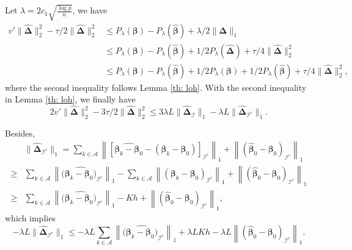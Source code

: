 \documentclass[twoside,12pt]{article}
\newcommand{\mb}[1]{\boldsymbol{\mathbf{#1}}}
\newcommand{\wh}[1]{\widehat{#1}}
\begin{document}
Let $\lambda= 2c_1 \sqrt{\frac{\log p}{n}}$, we have
\begin{equation*}
	\begin{aligned}
		v'\|\wh{\mb\Delta}\|_2^2-\tau/2\| \wh{\mb\Delta}\|_2^2&\leq P_{\lambda}(\mb\beta)-P_{\lambda}(\wh{\mb\beta})+\lambda/2\| \wh{\mb\Delta}\|_1\\
		&\leq P_{\lambda}(\mb\beta)-P_{\lambda}(\wh{\mb\beta})+1/2P_{\lambda}(\wh{\mb\Delta})+\tau/4 \|\wh{\mb\Delta}\|_2^2\\
  &\leq P_{\lambda}(\mb\beta)-P_{\lambda}(\wh{\mb\beta})+1/2P_{\lambda}(\mb\beta)+1/2 P_{\lambda}(\wh{\mb\beta})+\tau/4 \|\wh{\mb\Delta}\|_2^2,
	\end{aligned}
\end{equation*}
where the second inequality follows Lemma \ref{th: loh}.
With the second inequality in Lemma \ref{th: loh}, we finally have
$$2v'\|\wh{\mb\Delta}\|_2^2-3\tau/2\| \wh{\mb\Delta}\|_2^2\leq 3 \lambda L\|\wh{\mb\Delta}_{\mathcal I}\|_1-\lambda L \|\wh{\mb\Delta}_{\mathcal I^c}\|_1.$$

Besides,
\begin{equation}
	\label{eq: delta}
	\begin{aligned}
		&\|\wh{\mb\Delta}_{\mathcal I^c}\|_1=\sum_{k\in\mathcal A}\left\|\left[\wh{\mb\beta_k-\mb\beta_0}-(\mb\beta_k-\mb\beta_0)\right]_{\mathcal I^c}\right\|_1+\left\|(\wh{\mb\beta}_0-{\mb\beta}_0)_{\mathcal I^c}\right\|_1\\
		\geq & \sum_{k\in\mathcal A}\left\|(\wh{\mb\beta_k-\mb\beta_0)}_{\mathcal I^c}\right\|_1-\sum_{k\in\mathcal A}\left\|(\mb\beta_k-\mb\beta_0)_{\mathcal I^c}\right\|_1+\left\|(\wh{\mb\beta}_0-{\mb\beta}_0)_{\mathcal I^c}\right\|_1\\
		\geq & \sum_{k\in\mathcal A}\left\|(\wh{\mb\beta_k-\mb\beta_0)}_{\mathcal I^c}\right\|_1-Kh+\left\|(\wh{\mb\beta}_0-{\mb\beta}_0)_{\mathcal I^c}\right\|_1,
	\end{aligned}
\end{equation}
which implies
\begin{equation}
	\label{eq: deltaI}
	-\lambda L\|\wh{\mb\Delta}_{\mathcal I^c}\|_1\leq -\lambda L\sum_{k\in\mathcal A}\left\|(\wh{\mb\beta_k-\mb\beta_0)}_{\mathcal I^c}\right\|_1+\lambda LKh-\lambda L\left\|(\wh{\mb\beta}_0-{\mb\beta}_0)_{\mathcal I^c}\right\|_1.
\end{equation}
\end{document}

